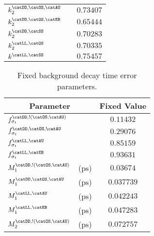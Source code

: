\begin{table}[h]
\begin{tabular}{llr@{$\,\pm\,$}l}
  $k_2^\text{\catDD,\catOS,\catAU}$          &                       & \multicolumn{2}{c}{$0.73407$}\\
  $k_2^\text{\catDD,\catOS,\catEB}$          &                       & \multicolumn{2}{c}{$0.65444$}\\
  $k_2^\text{\catDD,\catSS}$                 &                       & \multicolumn{2}{c}{$0.70283$}\\
  $k_2^\text{\catLL,\catOS}$                 &                       & \multicolumn{2}{c}{$0.70335$}\\
  $k^\text{\catLL,\catSS}$                   &                       & \multicolumn{2}{c}{$0.75457$}\\
  \bottomrule
\end{tabular}
\end{table}
%
\begin{table}[h]
\caption{Fixed background decay time error parameters.}
\label{tab:app:measurement_of_sin2beta:cpv_measurement:fixed_parameters:decay_time_error:bkg}
\centering
\begin{tabular}{llr@{$\,\pm\,$}l}
  \toprule
  \multicolumn{2}{c}{Parameter}                  & \multicolumn{2}{c}{Fixed Value} \\
  \midrule
  $f_{\sigma_t}^\text{\catDD,!(\catOS,\catAU)}$  &                       & \multicolumn{2}{c}{$0.11432$}\\
  $f_{\sigma_t}^\text{\catDD,\catOS,\catAU}$     &                       & \multicolumn{2}{c}{$0.29076$}\\
  $f_{\sigma_t}^\text{\catLL,\catAU}$            &                       & \multicolumn{2}{c}{$0.85159$}\\
  $f_{\sigma_t}^\text{\catLL,\catEB}$            &                       & \multicolumn{2}{c}{$0.93631$}\\
  $M_1^\text{\catDD,!(\catOS,\catAU)}$           & ($\si{\pico\second}$) & \multicolumn{2}{c}{$0.03674$}\\
  $M_1^\text{\catDD,\catOS,\catAU}$              & ($\si{\pico\second}$) & \multicolumn{2}{c}{$0.037739$}\\
  $M_1^\text{\catLL,\catAU}$                     & ($\si{\pico\second}$) & \multicolumn{2}{c}{$0.042243$}\\
  $M_1^\text{\catLL,\catEB}$                     & ($\si{\pico\second}$) & \multicolumn{2}{c}{$0.047283$}\\
  $M_2^\text{\catDD,!(\catOS,\catAU)}$           & ($\si{\pico\second}$) & \multicolumn{2}{c}{$0.072757$}\\

\end{tabular}
\end{table}
